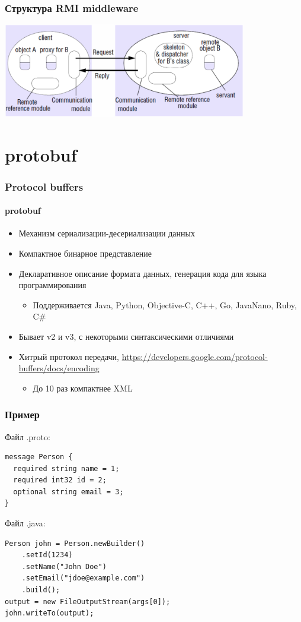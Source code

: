 \documentclass[xetex,mathserif,serif]{beamer}
\begin{document}
	\begin{frame}
		\frametitle{Структура RMI middleware}
		\begin{center}
			\includegraphics[width=0.8\textwidth]{rmiArchitecture.png}
		\end{center}
	\end{frame}

	\section{protobuf}

	\begin{frame}
		\frametitle{Protocol buffers}
		\framesubtitle{protobuf}
		\begin{itemize}
			\item Механизм сериализации-десериализации данных
			\item Компактное бинарное представление
			\item Декларативное описание формата данных, генерация кода для языка программирования
			\begin{itemize}
				\item Поддерживается Java, Python, Objective-C, C++, Go, JavaNano, Ruby, C\#
			\end{itemize}
			\item Бывает v2 и v3, с некоторыми синтаксическими отличиями
			\item Хитрый протокол передачи, \url{https://developers.google.com/protocol-buffers/docs/encoding}
			\begin{itemize}
				\item До 10 раз компактнее XML 
			\end{itemize}
		\end{itemize}
	\end{frame}

	\begin{frame}[fragile]
		\frametitle{Пример}
		Файл .proto:
		\begin{verbatim}
message Person {
  required string name = 1;
  required int32 id = 2;
  optional string email = 3;
}
		\end{verbatim}
		\vspace{2mm}
		Файл .java:
		\begin{verbatim}
Person john = Person.newBuilder()
    .setId(1234)
    .setName("John Doe")
    .setEmail("jdoe@example.com")
    .build();
output = new FileOutputStream(args[0]);
john.writeTo(output);
		\end{verbatim}
	\end{frame}
\end{document}
